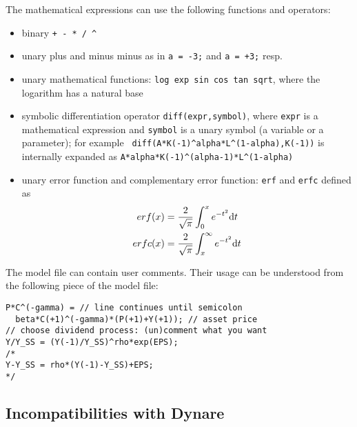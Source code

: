 \documentclass[10pt]{article}
\begin{document}
The mathematical expressions can use the following functions and operators:
\begin{itemize}
\item binary {\tt + - * / \verb|^|}
\item unary plus and minus minus as in {\tt a = -3;} and {\tt a = +3;} resp.
\item unary mathematical functions: {\tt log exp sin cos tan
sqrt}, whe\-re the logarithm has a natural base
\item symbolic differentiation operator {\tt diff(expr,symbol)}, where
{\tt expr} is a mathematical expression and {\tt symbol} is a unary
symbol (a variable or a parameter); for example {\tt
  diff(A*K(-1)\verb|^|alpha*L\verb|^|(1-alpha),K(-1))} is internally expanded as
{\tt A*alpha*K(-1)\verb|^|(alpha-1)*L\verb|^|(1-alpha)}
\item unary error function and complementary error function: {\tt erf}
and {\tt erfc} defined as
\begin{eqnarray*}
erf(x) &= \frac{2}{\sqrt{\pi}}\int_0^x e^{-t^2}{\rm d}t\\
erfc(x)&= \frac{2}{\sqrt{\pi}}\int_x^\infty e^{-t^2}{\rm d}t
\end{eqnarray*}
\end{itemize}

The model file can contain user comments. Their usage can be
understood from the following piece of the model file:

{\small
\begin{verbatim}
P*C^(-gamma) = // line continues until semicolon
  beta*C(+1)^(-gamma)*(P(+1)+Y(+1)); // asset price
// choose dividend process: (un)comment what you want
Y/Y_SS = (Y(-1)/Y_SS)^rho*exp(EPS);
/*
Y-Y_SS = rho*(Y(-1)-Y_SS)+EPS;
*/
\end{verbatim}
}

\subsection{Incompatibilities with Dynare}
\end{document}
